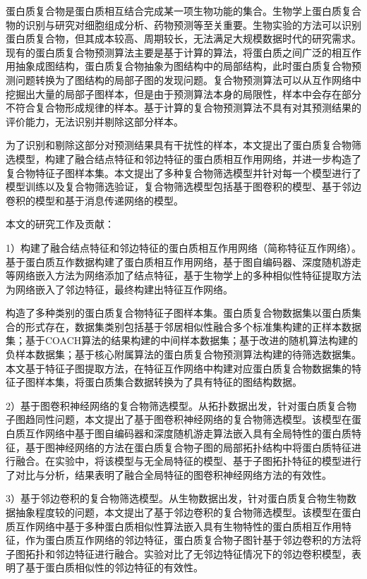 \begin{cabstract}
  蛋白质复合物是蛋白质相互结合完成某一项生物功能的集合。生物学上蛋白质复合物的识别与研究对细胞组成分析、药物预测等至关重要。生物实验的方法可以识别蛋白质复合物，但其成本较高、周期较长，无法满足大规模数据时代的研究需求。
  现有的蛋白质复合物预测算法主要是基于计算的算法，将蛋白质之间广泛的相互作用抽象成图结构，蛋白质复合物抽象为图结构中的局部结构，此时蛋白质复合物预测问题转换为了图结构的局部子图的发现问题。复合物预测算法可以从互作网络中挖掘出大量的局部子图样本，但是由于预测算法本身的局限性，样本中会存在部分不符合复合物形成规律的样本。基于计算的复合物预测算法不具有对其预测结果的评价能力，无法识别并剔除这部分样本。

  为了识别和剔除这部分对预测结果具有干扰性的样本，本文提出了蛋白质复合物筛选模型，构建了融合结点特征和邻边特征的蛋白质相互作用网络，并进一步构造了复合物特征子图样本集。本文提出了多种复合物筛选模型并针对每一个模型进行了模型训练以及复合物筛选验证，复合物筛选模型包括基于图卷积的模型、基于邻边卷积的模型和基于消息传递网络的模型。

  本文的研究工作及贡献：

  1）构建了融合结点特征和邻边特征的蛋白质相互作用网络（简称特征互作网络）。基于蛋白质互作数据构建了蛋白质相互作用网络，基于图自编码器、深度随机游走等网络嵌入方法为网络添加了结点特征，基于生物学上的多种相似性特征提取方法为网络嵌入了邻边特征，最终构建出特征互作网络。

  构造了多种类别的蛋白质复合物特征子图样本集。蛋白质复合物数据集以蛋白质集合的形式存在，数据集类别包括基于邻居相似性融合多个标准集构建的正样本数据集；基于COACH算法的结果构建的中间样本数据集；基于改进的随机算法构建的负样本数据集；基于核心附属算法的蛋白质复合物预测算法构建的待筛选数据集。本文基于特征子图提取方法，在特征互作网络中构建对应蛋白质复合物数据集的特征子图样本集，将蛋白质集合数据转换为了具有特征的图结构数据。

  2）基于图卷积神经网络的复合物筛选模型。从拓扑数据出发，针对蛋白质复合物子图趋同性问题，本文提出了基于图卷积神经网络的复合物筛选模型。该模型在蛋白质互作网络中基于图自编码器和深度随机游走算法嵌入具有全局特性的蛋白质特征，基于图神经网络的方法在蛋白质复合物子图的局部拓扑结构中将蛋白质特征进行融合。在实验中，将该模型与无全局特征的模型、基于子图拓扑特征的模型进行了对比与分析，结果表明了融合全局特征的图卷积神经网络方法的有效性。
  
  3）基于邻边卷积的复合物筛选模型。从生物数据出发，针对蛋白质复合物生物数据抽象程度较的问题，本文提出了基于邻边卷积的复合物筛选模型。该模型在蛋白质互作网络中基于多种蛋白质相似性算法嵌入具有生物特性的蛋白质相互作用特征，作为蛋白质互作网络的邻边特征，蛋白质复合物子图针基于邻边卷积的方法将子图拓扑和邻边特征进行融合。实验对比了无邻边特征情况下的邻边卷积模型，表明了基于蛋白质相似性的邻边特征的有效性。


\end{cabstract}

